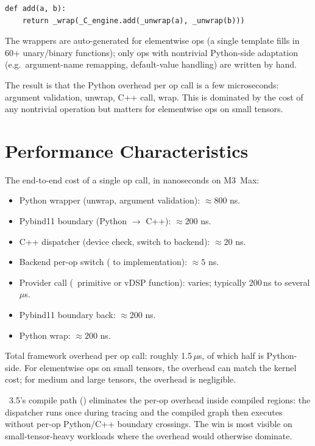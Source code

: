 \begin{lstlisting}[style=lucid,language=LucidPython]
def add(a, b):
    return _wrap(_C_engine.add(_unwrap(a), _unwrap(b)))
\end{lstlisting}

The wrappers are auto-generated for elementwise ops (a single
template fills in 60+ unary/binary functions); only ops with
nontrivial Python-side adaptation (e.g.\ argument-name remapping,
default-value handling) are written by hand.

The result is that the Python overhead per op call is a few
microseconds: argument validation, unwrap, C++ call, wrap. This is
dominated by the cost of any nontrivial operation but matters for
elementwise ops on small tensors.

\section{Performance Characteristics}
\label{sec:backend_dispatch:perf}

The end-to-end cost of a single op call, in nanoseconds on M3~Max:

\begin{itemize}
  \item Python wrapper (unwrap, argument validation): $\approx 800$
    ns.
  \item Pybind11 boundary (Python $\to$ C++): $\approx 200$ ns.
  \item C++ dispatcher (device check, switch to backend): $\approx
    20$ ns.
  \item Backend per-op switch ( to implementation):
    $\approx 5$ ns.
  \item Provider call (\MLX\ primitive or vDSP function): varies;
    typically 200\,ns to several $\mu$s.
  \item Pybind11 boundary back: $\approx 200$ ns.
  \item Python wrap: $\approx 200$ ns.
\end{itemize}

Total framework overhead per op call: roughly 1.5\,$\mu$s, of which
half is Python-side. For elementwise ops on small tensors, the
overhead can match the kernel cost; for medium and large tensors,
the overhead is negligible.

\Lucid\ 3.5's compile path () eliminates
the per-op overhead inside compiled regions: the dispatcher runs
once during tracing and the compiled graph then executes without
per-op Python/C++ boundary crossings. The win is most visible on
small-tensor-heavy workloads where the overhead would otherwise
dominate.

